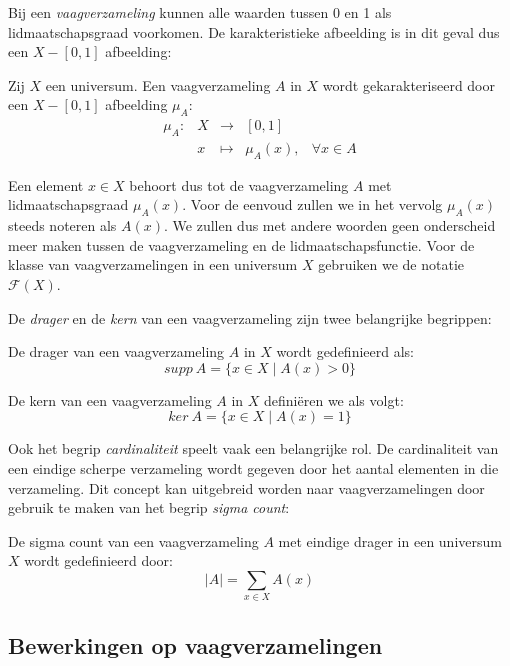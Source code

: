 Bij een \emph{vaagverzameling} kunnen alle waarden tussen 0 en 1 als lidmaatschapsgraad 
voorkomen. De karakteristieke afbeelding is in dit geval dus een $X - [0,1]$ afbeelding:
\begin{definitie}
Zij $X$ een universum. Een vaagverzameling $A$ in $X$ wordt gekarakteriseerd door een $X - [0,1]$
afbeelding  $\mu_A$:
$$
\begin{array}{lllll}
\mu_A: 	& X & \to 		& [0,1]	& \\
		& x & \mapsto 	& \mu_A(x),		& \forall x \in A
\end{array}
$$
\end{definitie}
\noindent
Een element $x \in X$ behoort dus tot de vaagverzameling $A$ met lidmaatschapsgraad $\mu_A(x)$.
Voor de eenvoud zullen we in het vervolg $\mu_A(x)$ steeds noteren als $A(x)$. We zullen dus 
met andere woorden geen onderscheid meer maken tussen de vaagverzameling en de 
lidmaatschapsfunctie. Voor de klasse van vaagverzamelingen in een universum $X$ gebruiken we
de notatie $\mathcal{F}(X)$.

De \emph{drager} en de \emph{kern} van een vaagverzameling zijn twee belangrijke begrippen: 
\begin{definitie}
De drager van een vaagverzameling $A$ in $X$ wordt gedefinieerd als:
$$
supp\ A = \{x \in X \mid A(x) > 0\} 
$$
\end{definitie}
\begin{definitie}
De kern van een vaagverzameling $A$ in $X$ defini\"eren we als volgt:
$$
ker\ A = \{x \in X \mid A(x) = 1\}
$$
\end{definitie}
\noindent
Ook het begrip \emph{cardinaliteit} speelt vaak een belangrijke rol. De cardinaliteit van een 
eindige scherpe verzameling wordt gegeven door het aantal elementen in die verzameling. 
Dit concept kan uitgebreid worden naar vaagverzamelingen door gebruik te maken van het begrip 
\emph{sigma count}:
\begin{definitie}
De sigma count van een vaagverzameling $A$ met eindige drager in een universum $X$ wordt
gedefinieerd door:
$$
|A|=\sum_{x \in X} A(x)
$$
\end{definitie}

\subsection{Bewerkingen op vaagverzamelingen}
\label{sectie:bew_op_vaagverz}

